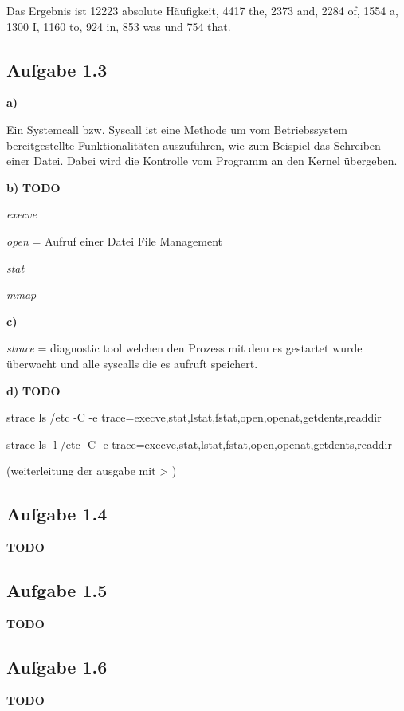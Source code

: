 \documentclass[a4paper,graphics,11pt]{article}
\newcommand{\aufgabe}[1]{\subsection*{Aufgabe #1}}
\begin{document}


Das Ergebnis ist 12223 absolute Häufigkeit, 4417 the, 2373 and, 2284 of, 1554 a, 1300 I, 1160 to, 924 in, 853 was und 754 that.

\aufgabe{1.3}
\textbf{a)}

Ein Systemcall bzw. Syscall ist eine Methode um vom Betriebssystem bereitgestellte Funktionalitäten auszuführen, wie zum Beispiel das Schreiben einer Datei. Dabei wird die Kontrolle vom Programm an den Kernel übergeben.

\textbf{b)}
\textbf{TODO}

\textit{execve}

\textit{open} = Aufruf einer Datei File Management

\textit{stat}

\textit{mmap}

\textbf{c)}

\textit{strace} = diagnostic tool welchen den Prozess mit dem es gestartet wurde überwacht und alle syscalls die es aufruft speichert.

\textbf{d)}
\textbf{TODO}

strace ls /etc -C -e trace=execve,stat,lstat,fstat,open,openat,getdents,readdir

strace ls -l /etc -C -e trace=execve,stat,lstat,fstat,open,openat,getdents,readdir

(weiterleitung der ausgabe mit > )

\aufgabe{1.4}
\textbf{TODO}

\aufgabe{1.5}
\textbf{TODO}

\aufgabe{1.6}
\textbf{TODO}
\end{document}
